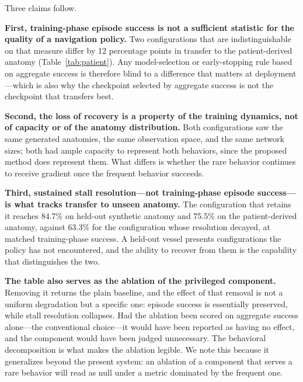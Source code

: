Three claims follow.

\textbf{First, training-phase episode success is not a sufficient statistic for the quality of a
navigation policy.} Two configurations that are indistinguishable on that measure differ by 12
percentage points in transfer to the patient-derived anatomy (Table~\ref{tab:patient}). Any
model-selection or early-stopping rule based on aggregate success is therefore blind to a
difference that matters at deployment---which is also why the checkpoint selected by aggregate
success is not the checkpoint that transfers best.

\textbf{Second, the loss of recovery is a property of the training dynamics, not of capacity or
of the anatomy distribution.} Both configurations saw the same generated anatomies, the same
observation space, and the same network sizes; both had ample capacity to represent both
behaviors, since the proposed method does represent them. What differs is whether the rare
behavior continues to receive gradient once the frequent behavior succeeds.

\textbf{Third, sustained stall resolution---not training-phase episode success---is what tracks
transfer to unseen anatomy.} The configuration that retains it reaches 84.7\% on held-out
synthetic anatomy and 75.5\% on the patient-derived anatomy, against 63.3\% for the configuration
whose resolution decayed, at matched training-phase success. A held-out vessel presents
configurations the policy has not encountered, and the ability to recover from them is the
capability that distinguishes the two.

\textbf{The table also serves as the ablation of the privileged component.} Removing it returns
the plain baseline, and the effect of that removal is not a uniform degradation but a specific
one: episode success is essentially preserved, while stall resolution collapses. Had the ablation
been scored on aggregate success alone---the conventional choice---it would have been reported as
having no effect, and the component would have been judged unnecessary. The behavioral
decomposition is what makes the ablation legible. We note this because it generalizes beyond the
present system: an ablation of a component that serves a rare behavior will read as null under a
metric dominated by the frequent one.

